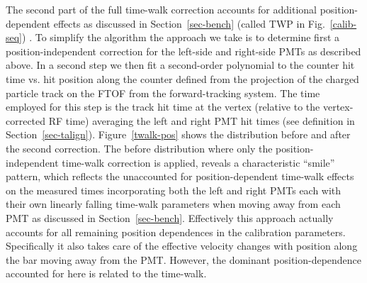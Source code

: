 \documentclass{elsart}
\begin{document}
The second part of the full time-walk correction accounts for additional position-dependent effects as
discussed in Section~\ref{sec-bench} (called TWP in Fig.~\ref{calib-seq}) . To simplify the algorithm the
approach we take is to determine first a position-independent correction for the left-side and right-side
PMTs as described above. In a second step we then fit a second-order polynomial to the counter hit time
vs. hit position along the counter defined from the projection of the charged particle track on the FTOF from
the forward-tracking system. The time employed for this step is the track hit time at the vertex (relative
to the vertex-corrected RF time) averaging the left and right PMT hit times (see definition in
Section~\ref{sec-talign}). Figure~\ref{twalk-pos} shows the distribution before and after the second correction.
The before distribution where only the position-independent time-walk correction is applied, reveals a
characteristic ``smile'' pattern, which reflects the unaccounted for position-dependent time-walk effects on
the measured times incorporating both the left and right PMTs each with their own linearly falling time-walk
parameters when moving away from each PMT as discussed in Section~\ref{sec-bench}. Effectively this approach
actually accounts for all remaining position dependences in the calibration parameters. Specifically it also takes
care of the effective velocity changes with position along the bar moving away from the PMT. However, the
dominant position-dependence accounted for here is related to the time-walk.
\end{document}
